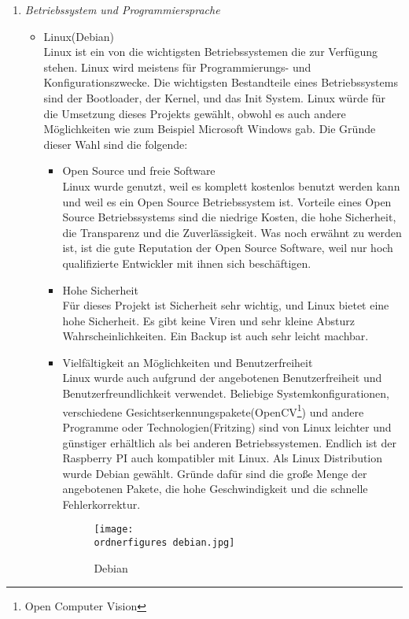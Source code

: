 \begin{enumerate}
	\item \textit{Betriebssystem und Programmiersprache} \\
	\begin{itemize}
		\item Linux(Debian) \\
		Linux ist ein von die wichtigsten Betriebssystemen die zur Verfügung stehen. Linux wird meistens für Programmierungs- und Konfigurationszwecke. Die wichtigsten Bestandteile eines Betriebssystems sind der Bootloader, der Kernel, und das Init System. Linux würde für die Umsetzung dieses Projekts gewählt, obwohl es auch andere Möglichkeiten wie zum Beispiel Microsoft Windows gab. Die Gründe dieser Wahl sind die folgende: 
		\begin{itemize}
			\item Open Source und freie Software \\
			Linux wurde genutzt, weil es komplett kostenlos benutzt werden kann und weil es ein Open Source Betriebssystem ist. Vorteile eines Open Source Betriebssystems sind die niedrige Kosten, die hohe Sicherheit, die Transparenz und die Zuverlässigkeit. Was noch erwähnt zu werden ist, ist die gute Reputation der Open Source Software, weil nur hoch qualifizierte Entwickler mit ihnen sich beschäftigen.
			\item Hohe Sicherheit \\
			Für dieses Projekt ist Sicherheit sehr wichtig, und Linux bietet eine hohe Sicherheit. Es gibt keine Viren und sehr kleine Absturz Wahrscheinlichkeiten. Ein Backup ist auch sehr leicht machbar.
			\item Vielfältigkeit an Möglichkeiten und Benutzerfreiheit \\
			Linux wurde auch aufgrund der angebotenen Benutzerfreiheit und Benutzerfreundlichkeit verwendet. Beliebige Systemkonfigurationen, verschiedene Gesichtserkennungspakete(OpenCV\footnote{Open Computer Vision}) und andere Programme oder Technologien(Fritzing) sind von Linux leichter und günstiger erhältlich als bei anderen Betriebssystemen. Endlich ist der Raspberry PI auch kompatibler mit Linux.
			Als Linux Distribution wurde Debian gewählt. Gründe dafür sind die große Menge der angebotenen Pakete, die hohe Geschwindigkeit und die schnelle Fehlerkorrektur. 
			\cite{Linux}
			\begin{figure}[H]
				\texttt{[image: \\ordnerfigures debian.jpg]}
				\centering
				\caption{Debian\cite{DebianBild}}
			\end{figure}	
		\end{itemize}
		

\end{itemize}
\end{enumerate}
